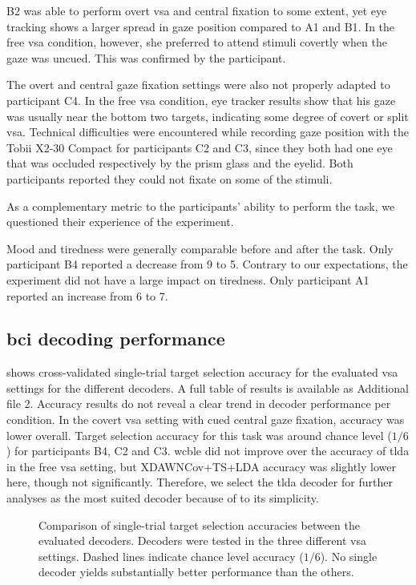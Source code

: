 \documentclass{article}
\begin{document}
B2 was able to perform overt \ac{vsa} and central fixation to some extent,
yet eye tracking shows a larger spread in gaze position compared to
A1 and B1.
In the free \ac{vsa} condition, however, she preferred to attend
stimuli covertly when the gaze was uncued.
This was confirmed by the participant.

The overt and central gaze fixation settings were also not properly adapted to
participant C4.
In the free \ac{vsa} condition, eye tracker results show that his gaze was usually near the
bottom two targets, indicating some degree of covert or split \ac{vsa}.
Technical difficulties were encountered while recording gaze position with the
Tobii X2-30
Compact for participants C2 and C3, since they both had one eye that was
occluded respectively by the prism glass and the eyelid.
Both participants reported they could not fixate on some of the
stimuli.

As a complementary metric to the participants' ability to perform the task,
we questioned their experience of the experiment.
\begin{table}
	
	\caption{Participant experience of the visual \ac{bci} task.}
\end{table}
Mood and tiredness were generally comparable before and after the task.
Only participant B4 reported a decrease from 9 to 5.
Contrary to our expectations, the experiment did not have a large impact on tiredness.
Only participant A1 reported an increase from 6 to 7.


\subsection{\Acs{bci} decoding performance}

 shows cross-validated single-trial target selection
accuracy for the evaluated \ac{vsa} settings for the different decoders.
A full table of results is available as Additional file 2.
Accuracy results do not reveal a clear trend in decoder performance per
condition.
In the covert \ac{vsa} setting with cued central gaze fixation, accuracy
was lower overall.
Target selection accuracy for this task was around chance level ($1/6$) for
participants B4, C2 and C3.
\Ac{wcble} did not improve over the accuracy of \ac{tlda} in the free \ac{vsa} setting, but
XDAWNCov+TS+LDA accuracy was slightly lower here, though not
significantly.
Therefore, we select the \ac{tlda} decoder for further analyses as the most
suited decoder because of to its simplicity.
\begin{figure}
	
	\caption{%
		Comparison of single-trial target selection accuracies between the
		evaluated decoders.
		Decoders were tested in the three different \ac{vsa} settings.
		Dashed lines indicate chance level accuracy ($1/6$).
		No single decoder yields substantially better performance than the others.
	}%
	\label{fig:patients/decode}
\end{figure}
\end{document}
